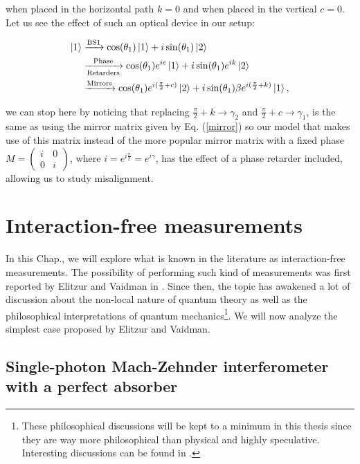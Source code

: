 \documentclass[12pt]{book}
\newcommand\blankpage{
    \null
    \thispagestyle{empty}
    \addtocounter{page}{0}
    \newpage
    }
\begin{document}
when placed in the horizontal path $k=0$ and when placed in the vertical $c=0$. Let us see the effect of such an optical device in our setup:

\begin{align*}
\ket{1}&\xrightarrow{\text{BS1}}\cos(\theta_{1})\ket{1}+i\sin(\theta_{1})\ket{2}\\ &\xrightarrow[\text{Retarders}]{\text{Phase}}\cos(\theta_{1})e^{ic}\ket{1}+i\sin(\theta_{1}) e^{ik}\ket{2} \\ &\xrightarrow{\text{Mirrors}} \cos(\theta_{1})e^{i(\frac{\pi}{2}+c)}\ket{2}+i\sin(\theta_{1})\beta e^{i(\frac{\pi}{2}+k)}\ket{1},
\end{align*}

we can stop here by noticing that replacing $\frac{\pi}{2}+k\xrightarrow{}\gamma_{2}$ and  $\frac{\pi}{2}+c\xrightarrow{}\gamma_{1}$,  is the same as using the mirror matrix given by Eq. (\ref{mirror}) so our model that makes use of this matrix  instead of the more popular mirror matrix with a fixed phase $M=\begin{pmatrix} i & 0\\0& i\end{pmatrix}$, where $i=e^{i \frac{\pi}{2}}=e^{i\gamma}$, has the  effect of a phase retarder included, allowing us to study misalignment. 

\afterpage{\blankpage}

\chapter{ Interaction-free  measurements}


In this Chap., we will explore what is known in the literature as interaction-free measurements. The possibility of performing such kind of measurements was first reported by Elitzur and Vaidman in \cite{Elitzur}. Since then, the topic has awakened a lot of discussion about the non-local nature of quantum theory as well as the philosophical interpretations of quantum mechanics\footnote{ These philosophical discussions will be kept to a minimum in this thesis since they are way more philosophical than physical and highly speculative. Interesting discussions can be found in \cite{paper_vaidman, maudlin}. }. We will now analyze the simplest case proposed by Elitzur and Vaidman.

\section[Elitzur-Vaidman's bomb detector]{Single-photon Mach-Zehnder interferometer with a perfect absorber}
\end{document}
